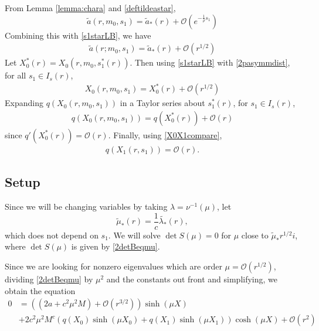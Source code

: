 \documentclass[thesis.tex]{subfiles}
\begin{document}
From Lemma \ref{lemma:chara} and \cref{deftildeastar},
\[
\tilde{a}(r, m_0, s_1) = \tilde{a}_*(r) + \mathcal{O}\left( e^{-\frac{1}{\rho}s_1} \right)
\]
Combining this with \cref{s1starLB}, we have
\begin{align}\label{tildeasub}
\tilde{a}(r; m_0, s_1) = \tilde{a}_*(r) + \mathcal{O}\left( r^{1/2} \right)
\end{align}
Let $X_0^*(r) = X_0(r, m_0, s_1^*(r))$. Then using \cref{s1starLB} with \cref{2pasymmdist}, for all $s_1 \in I_s(r)$,
\begin{align}\label{X0sub}
X_0(r, m_0, s_1) = X_0^*(r) + \mathcal{O}\left( r^{1/2} \right)
\end{align}
Expanding $q(X_0(r, m_0, s_1))$ in a Taylor series about $s_1^*(r)$, for $s_1 \in I_s(r)$,
\begin{align}\label{qX0sub}
q( X_0(r, m_0, s_1) ) = q(X_0^*(r)) + \mathcal{O}\left(r \right)
\end{align}
since $q'(X_0^*(r)) = \mathcal{O}(r)$. Finally, using \cref{X0X1compare},
\begin{align}\label{qX1bound}
q(X_1(r, s_1)) = \mathcal{O}(r).
\end{align}

\subsection{Setup}

Since we will be changing variables by taking $\lambda = \nu^{-1}(\mu)$, let 
\begin{equation}\label{Kreinmustar1}
\tilde{\mu}_*(r) = \frac{1}{c} \tilde{\lambda_*}(r),
\end{equation}
which does not depend on $s_1$. We will solve $\det S(\mu) = 0$ for $\mu$ close to $\tilde{\mu}_* r^{1/2} i$, where $\det S(\mu)$ is given by \cref{2detBeqmu}.

Since we are looking for nonzero eigenvalues which are order $\mu = \mathcal{O}(r^{1/2})$, dividing \cref{2detBeqmu} by $\mu^2$ and the constants out front and simplifying, we obtain the equation
\begin{equation}\label{KreinB1}
\begin{aligned}
0 &= \left( (2a + c^2 \mu^2 M) + \mathcal{O}( r^{3/2} )\right) \sinh(\mu X) \\
&+ 2 c^2 \mu^2 M^c ( q(X_0) \sinh(\mu X_0) + q(X_1) \sinh(\mu X_1) ) \cosh(\mu X) + \mathcal{O}( r^2 ) 
\end{aligned}
\end{equation}
\end{document}
